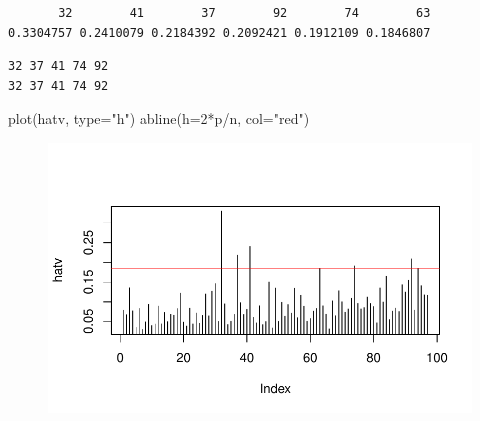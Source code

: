\documentclass[
  letterpaper,
  DIV=11,
  numbers=noendperiod]{scrartcl}
\newenvironment{Shaded}{\begin{snugshade}}{\end{snugshade}}
\newcommand{\AttributeTok}[1]{\textcolor[rgb]{0.40,0.45,0.13}{#1}}
\newcommand{\CommentTok}[1]{\textcolor[rgb]{0.37,0.37,0.37}{#1}}
\newcommand{\DecValTok}[1]{\textcolor[rgb]{0.68,0.00,0.00}{#1}}
\newcommand{\FunctionTok}[1]{\textcolor[rgb]{0.28,0.35,0.67}{#1}}
\newcommand{\NormalTok}[1]{\textcolor[rgb]{0.00,0.23,0.31}{#1}}
\newcommand{\OtherTok}[1]{\textcolor[rgb]{0.00,0.23,0.31}{#1}}
\newcommand{\SpecialCharTok}[1]{\textcolor[rgb]{0.37,0.37,0.37}{#1}}
\newcommand{\StringTok}[1]{\textcolor[rgb]{0.13,0.47,0.30}{#1}}
\begin{document}
\begin{verbatim}
       32        41        37        92        74        63 
0.3304757 0.2410079 0.2184392 0.2092421 0.1912109 0.1846807 
\end{verbatim}

\begin{Shaded}
\end{Shaded}

\begin{verbatim}
32 37 41 74 92 
32 37 41 74 92 
\end{verbatim}

\begin{Shaded}
\begin{Highlighting}[]
\FunctionTok{plot}\NormalTok{(hatv, }\AttributeTok{type=}\StringTok{"h"}\NormalTok{)}
 \FunctionTok{abline}\NormalTok{(}\AttributeTok{h=}\DecValTok{2}\SpecialCharTok{*}\NormalTok{p}\SpecialCharTok{/}\NormalTok{n, }\AttributeTok{col=}\StringTok{"red"}\NormalTok{)}
\end{Highlighting}
\end{Shaded}

\begin{figure}[H]

{\centering \includegraphics{Regresion-Lineal_files/figure-pdf/unnamed-chunk-21-1.pdf}

}

\end{figure}
\end{document}
